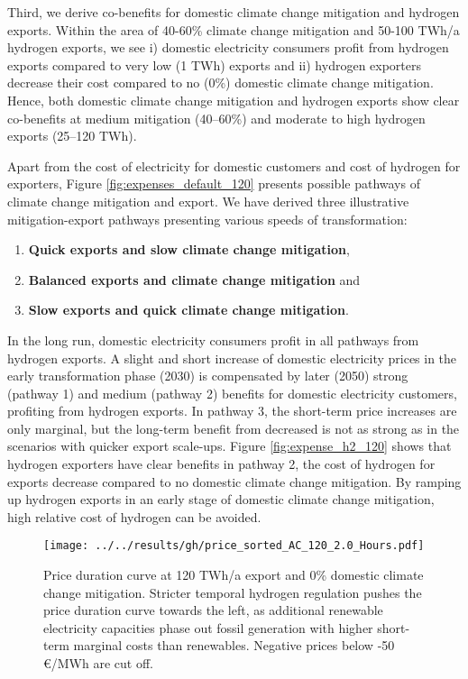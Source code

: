 Third, we derive co-benefits for domestic climate change mitigation and hydrogen exports. 
Within the area of 40-60\% climate change mitigation and 50-100 TWh/a hydrogen exports, we see i) domestic electricity consumers profit from hydrogen exports compared to very low (1 TWh) exports and ii) hydrogen exporters decrease their cost compared to no (0\%) domestic climate change mitigation. Hence, both domestic climate change mitigation and hydrogen exports show clear co-benefits at medium mitigation (40--60\%) and moderate to high hydrogen exports (25--120 TWh). 


Apart from the cost of electricity for domestic customers and cost of hydrogen for exporters, Figure \ref{fig:expenses_default_120} presents possible pathways of climate change mitigation and export. We have derived three illustrative mitigation-export pathways presenting various speeds of transformation:
\begin{enumerate}
    \item \textbf{Quick exports and slow climate change mitigation},
    \item \textbf{Balanced exports and climate change mitigation} and
    \item \textbf{Slow exports and quick climate change mitigation}.
\end{enumerate}

In the long run, domestic electricity consumers profit in all pathways from hydrogen exports. A slight and short increase of domestic electricity prices in the early transformation phase (2030) is compensated by later (2050) strong (pathway 1) and medium (pathway 2) benefits for domestic electricity customers, profiting from hydrogen exports.
In pathway 3, the short-term price increases are only marginal, but the long-term benefit from decreased is not as strong as in the scenarios with quicker export scale-ups. Figure \ref{fig:expense_h2_120} shows that hydrogen exporters have clear benefits in pathway 2, the cost of hydrogen for exports decrease compared to no domestic climate change mitigation. By ramping up hydrogen exports in an early stage of domestic climate change mitigation, high relative cost of hydrogen can be avoided.


\begin{figure}[h!]
    \centering
    \texttt{[image: ../../results/gh/price\_sorted\_AC\_120\_2.0\_Hours.pdf]}
    \caption{Price duration curve at 120 TWh/a export and 0\% domestic climate change mitigation. Stricter temporal hydrogen regulation pushes the price duration curve towards the left, as additional renewable electricity capacities phase out fossil generation with higher short-term marginal costs than renewables. Negative prices below -50 €/MWh are cut off.}
    \label{fig:pdc-120-0}
\end{figure}




